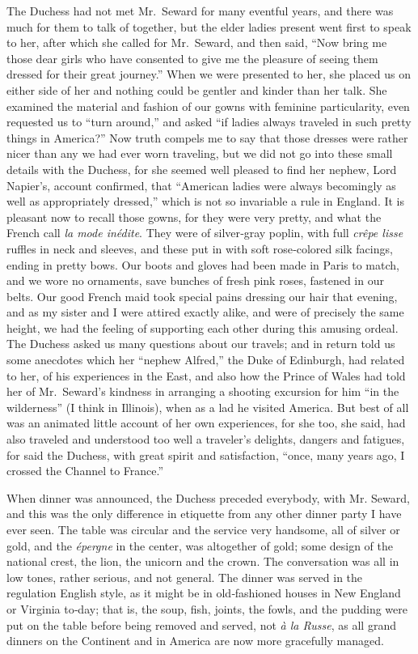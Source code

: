 \documentclass[12pt]{book}
\begin{document}
The Duchess had not met Mr.~Seward for many eventful
years, and there was much for them to talk of together, but the elder ladies present
went first to speak to her, after which she called for Mr.~Seward, and then said,
“Now bring me those dear girls who have consented to give me the pleasure of
seeing them dressed for their great journey.” When we were presented to her,
she placed us on either side of her and nothing could be gentler and kinder than
her talk. She examined the material and fashion of our gowns with feminine
particularity, even requested us to “turn around,” and asked “if ladies always
traveled in such pretty things in America?” Now truth compels me to say that
those dresses were rather nicer than any we had ever worn traveling, but we did
not go into these small details with the Duchess, for she seemed well pleased to
find her nephew, Lord Napier’s, account confirmed, that “American ladies were
always becomingly as well as appropriately dressed,” which is not so invariable a
rule in England. It is pleasant now to recall those gowns, for they were very pretty,
and what the French call {\it la mode inédite}. They were of silver‐gray poplin, with
full {\it crêpe lisse} ruffles in neck and sleeves, and these put in with soft rose‐colored
silk facings, ending in pretty bows. Our boots and gloves had been made in Paris
to match, and we wore no ornaments, save bunches of fresh pink roses, fastened
in our belts. Our good French maid took special pains dressing our hair that
evening, and as my sister and I were attired exactly alike, and were of precisely
the same height, we had the feeling of supporting each other during this amusing
ordeal. The Duchess asked us many questions about our travels; and in return
told us some anecdotes which her “nephew Alfred,” the Duke of Edinburgh, had
related to her, of his experiences in the East, and also how the Prince of Wales
had told her of Mr.~Seward’s kindness in arranging a shooting excursion for him
“in the wilderness” (I think in Illinois), when as a lad he visited America. But
best of all was an animated little account of her own experiences, for she too,
she said, had also traveled and understood too well a traveler’s delights, dangers
and fatigues, for said the Duchess, with great spirit and satisfaction, “once, many
years ago, I crossed the Channel to France.”

When dinner was announced, the Duchess preceded everybody, with Mr.
Seward, and this was the only difference in etiquette from any other dinner party
I have ever seen. The table was circular and the service very handsome, all of
silver or gold, and the {\it épergne} in the center, was altogether of gold; some design
of the national crest, the lion, the unicorn and the crown. The conversation was
all in low tones, rather serious, and not general. The dinner was served in the
regulation English style, as it might be in old‐fashioned houses in New England
or Virginia to‐day; that is, the soup, fish, joints, the fowls, and the pudding were
put on the table before being removed and served, not {\it à la Russe}, as all grand
dinners on the Continent and in America are now more gracefully managed.
\end{document}
